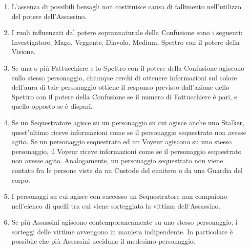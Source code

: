 \documentclass[a4paper,10pt]{article}
\begin{document}
\begin{enumerate}
	\item L'assenza di possibili bersagli non costituisce causa di fallimento nell'utilizzo del potere dell'Assassino.
	
	\item I ruoli influenzati dal potere soprannaturale della Confusione sono i seguenti: Investigatore, Mago, Veggente, Diavolo, Medium, Spettro con il potere della Visione.
	
	\item Se una o più Fattucchiere e lo Spettro con il potere della Confusione agiscono sullo stesso personaggio, chiunque cerchi di ottenere informazioni sul colore dell'aura di tale personaggio ottiene il responso previsto dall'azione dello Spettro con il potere della Confusione se il numero di Fattucchiere è pari, e quello opposto se è dispari.
	
	\item Se un Sequestratore agisce su un personaggio su cui agisce anche uno Stalker, quest'ultimo riceve informazioni come se il personaggio sequestrato non avesse agito. Se un personaggio sequestrato ed un Voyeur agiscono su uno stesso personaggio, il Voyeur riceve informazioni come se il personaggio sequestrato non avesse agito. Analogamente, un personaggio sequestrato non viene contato fra le persone viste da un Custode del cimitero o da una Guardia del corpo.
	
	\item I personaggi su cui agisce con successo un Sequestratore non compaiono nell'elenco di quelli tra cui viene sorteggiata la vittima dell'Assassino.
	
	\item Se più Assassini agiscono contemporaneamente su uno stesso personaggio, i sorteggi delle vittime avvengono in maniera indipendente.
	In particolare è possibile che più Assassini uccidano il medesimo personaggio.
	

\end{enumerate}
\end{document}
